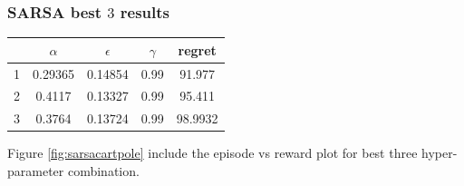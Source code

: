 \documentclass[11pt, a4]{article}
\begin{document}
			\subsubsection{SARSA best $3$ results}
				\begin{center}
					\begin{tabular}{|c|c|c|c|c|}
						\hline
						& $\alpha$ & $\epsilon$ & $\gamma$ & regret\\
						\hline
						1 & 0.29365  & 0.14854 & 0.99 & 91.977\\
						\hline
						2 & 0.4117 & 0.13327 & 0.99 & 95.411\\
						\hline
						3 & 0.3764 & 0.13724 & 0.99 & 98.9932\\
						\hline
					\end{tabular}					
				\end{center}
				Figure \ref{fig:sarsacartpole} include the episode vs reward plot for best three hyper-parameter combination.
\end{document}
